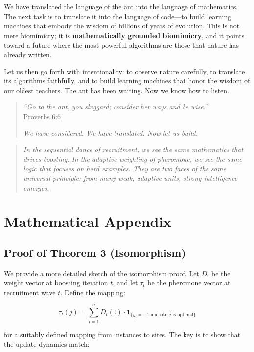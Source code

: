 \documentclass[12pt,letterpaper]{article}
\begin{document}
We have translated the language of the ant into the language of mathematics. The next task is to translate it into the language of code—to build learning machines that embody the wisdom of billions of years of evolution. This is not mere biomimicry; it is \textbf{mathematically grounded biomimicry}, and it points toward a future where the most powerful algorithms are those that nature has already written.

Let us then go forth with intentionality: to observe nature carefully, to translate its algorithms faithfully, and to build learning machines that honor the wisdom of our oldest teachers. The ant has been waiting. Now we know how to listen.

\begin{quote}
\emph{``Go to the ant, you sluggard; consider her ways and be wise.''} \\
\textemdash Proverbs 6:6

\emph{We have considered. We have translated. Now let us build.}
\end{quote}

\begin{quote}
\emph{In the sequential dance of recruitment, we see the same mathematics that drives boosting. In the adaptive weighting of pheromone, we see the same logic that focuses on hard examples. They are two faces of the same universal principle: from many weak, adaptive units, strong intelligence emerges.}
\end{quote}

\appendix
\section{Mathematical Appendix}

\subsection{Proof of Theorem 3 (Isomorphism)}

We provide a more detailed sketch of the isomorphism proof. Let $D_t$ be the weight vector at boosting iteration $t$, and let $\tau_t$ be the pheromone vector at recruitment wave $t$. Define the mapping:

\begin{equation}
\tau_t(j) = \sum_{i=1}^n D_t(i) \cdot \mathbf{1}_{\{y_i = +1 \text{ and site } j \text{ is optimal}\}}
\end{equation}

for a suitably defined mapping from instances to sites. The key is to show that the update dynamics match:
\end{document}

